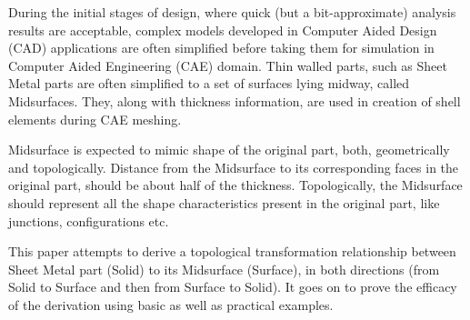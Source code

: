 During the initial stages of design, where quick (but a bit-approximate) analysis results are acceptable, complex models developed in Computer Aided Design (CAD) applications are often simplified before taking them for simulation in Computer Aided Engineering (CAE) domain. Thin walled parts, such as Sheet Metal parts are often simplified to a set of surfaces lying midway, called Midsurfaces. They, along with thickness information, are used in creation of shell elements during CAE meshing. 

Midsurface is expected to mimic shape of the original part, both, geometrically and topologically.  Distance from the Midsurface to its corresponding faces in the original part, should be about half of the thickness. Topologically, the Midsurface should represent all the shape characteristics present in the original part, like junctions, configurations etc.

This paper attempts to derive a topological transformation relationship between Sheet Metal part (Solid) to its Midsurface (Surface), in both directions (from Solid to Surface and then from Surface to Solid). It goes on to prove the efficacy of the derivation using basic as well as practical examples.

